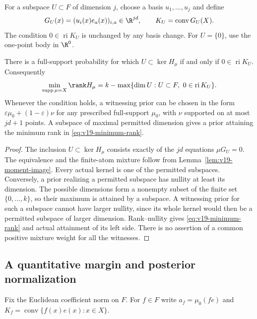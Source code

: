 For a subspace $U\subset F$ of dimension $j$, choose a basis
$u_1,\ldots,u_j$ and define
\[
 G_U(x)=(u_i(x)e_a(x))_{i,a}\in\R^{jd},\qquad
 K_U=\operatorname{conv}G_U(X).
\]
The condition $0\in\operatorname{ri}K_U$ is unchanged by any basis
change. For $U=\{0\}$, use the one-point body in $\R^0$.

\begin{theorem}
\label{thm:v19-rank-alternative}
There is a full-support probability for which $U\subset\ker H_\mu$
if and only if $0\in\operatorname{ri}K_U$. Consequently
\begin{equation}\label{eq:v19-minimum-rank}
 \min_{\operatorname{supp}\mu=X}\rank H_\mu
 = k-\max\{\dim U:U\subset F,\ 0\in\operatorname{ri}K_U\}.
\end{equation}
Whenever the condition holds, a witnessing prior can be chosen in the
form $\varepsilon\mu_0+(1-\varepsilon)\nu$ for any prescribed
full-support $\mu_0$, with $\nu$ supported on at most $jd+1$ points.
A subspace of maximal permitted dimension gives a prior attaining the
minimum rank in \eqref{eq:v19-minimum-rank}.
\end{theorem}
\begin{proof}
The inclusion $U\subset\ker H_\mu$ consists exactly of the $jd$
equations $\mu G_U=0$. The equivalence and the finite-atom mixture
follow from Lemma~\ref{lem:v19-moment-image}. Every actual kernel is
one of the permitted subspaces. Conversely, a prior realizing a
permitted subspace has nullity at least its dimension. The possible
dimensions form a nonempty subset of the finite set $\{0,\ldots,k\}$,
so their maximum is attained by a subspace. A witnessing prior for
such a subspace cannot have larger nullity, since its whole kernel
would then be a permitted subspace of larger dimension. Rank--nullity
gives \eqref{eq:v19-minimum-rank} and actual attainment of its left
side. There is no assertion of a common positive mixture weight for
all the witnesses.
\end{proof}

\subsection{A quantitative margin and posterior normalization}
Fix the Euclidean coefficient norm on $F$. For $f\in F$ write
$a_f=\mu_0(f e)$ and $K_f=\operatorname{conv}\{f(x)e(x):x\in X\}$.


